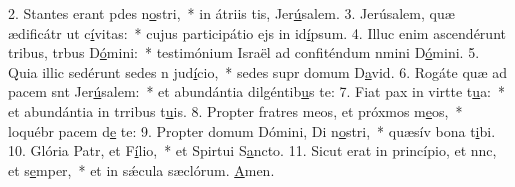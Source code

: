 2. Stantes erant pdes n\uline{o}stri,~* in átriis tis, Jer\uline{ú}salem.
3. Jerúsalem, quæ ædificátr ut c\uline{í}vitas:~* cujus participátio ejs in id\uline{í}psum.
4. Illuc enim ascendérunt tribus, trbus D\uline{ó}mini:~* testimónium Israël ad confiténdum nmini D\uline{ó}mini.
5. Quia illic sedérunt sedes n jud\uline{í}cio,~* sedes supr domum D\uline{a}vid.
6. Rogáte quæ ad pacem snt Jer\uline{ú}salem:~* et abundántia dilgéntib\uline{u}s te:
7. Fiat pax in virtte t\uline{u}a:~* et abundántia in trribus t\uline{u}is.
8. Propter fratres meos, et próxmos m\uline{e}os,~* loquébr pacem d\uline{e} te:
9. Propter domum Dómini, Di n\uline{o}stri,~* quæsív bona t\uline{i}bi.
10. Glória Patr, et F\uline{í}lio,~* et Spirtui S\uline{a}ncto.
11. Sicut erat in princípio, et nnc, et s\uline{e}mper,~* et in sǽcula sæclórum. \uline{A}men.
